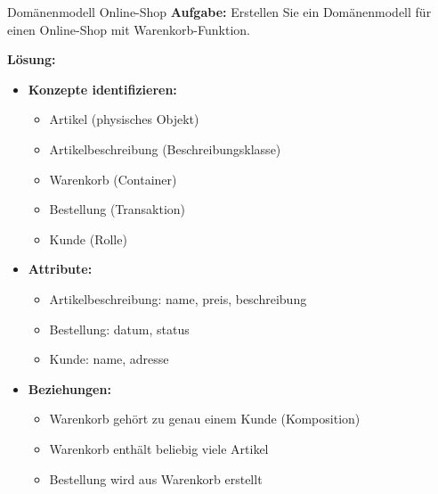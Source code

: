 \begin{example}{Domänenmodell Online-Shop}
\textbf{Aufgabe:} Erstellen Sie ein Domänenmodell für einen Online-Shop mit Warenkorb-Funktion.

\textbf{Lösung:}
\begin{itemize}
    \item \textbf{Konzepte identifizieren:}
    \begin{itemize}
        \item Artikel (physisches Objekt)
        \item Artikelbeschreibung (Beschreibungsklasse)
        \item Warenkorb (Container)
        \item Bestellung (Transaktion)
        \item Kunde (Rolle)
    \end{itemize}
    \item \textbf{Attribute:}
    \begin{itemize}
        \item Artikelbeschreibung: name, preis, beschreibung
        \item Bestellung: datum, status
        \item Kunde: name, adresse
    \end{itemize}
    \item \textbf{Beziehungen:}
    \begin{itemize}
        \item Warenkorb gehört zu genau einem Kunde (Komposition)
        \item Warenkorb enthält beliebig viele Artikel
        \item Bestellung wird aus Warenkorb erstellt
    \end{itemize}
\end{itemize}
\end{example}

